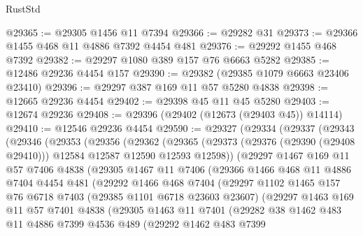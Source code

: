 \begin{lexlean}{RustStd}
\begin{coremodule}
{\begin{coremodule}
{{{{{{{{{{{{{{{{{{{{{{{{{{{{{{{{{{{{{{{{{{{{{{{{{{{{{{{{{{{{{{{{{{{{{{{{{{{{{{{{@29365 := @29305 @1456 @11 @7394
@29366 := @29282 @31
@29373 := @29366 @1455 @468 @11 @4886 @7392 @4454 @481
@29376 := @29292 @1455 @468 @7392
@29382 := @29297 @1080 @389 @157 @76 @6663 @5282
@29385 := @12486 @29236 @4454 @157
@29390 := @29382 (@29385 @1079 @6663 @23406 @23410)
@29396 := @29297 @387 @169 @11 @57 @5280 @4838
@29398 := @12665 @29236 @4454
@29402 := @29398 @45 @11 @45 @5280
@29403 := @12674 @29236
@29408 := @29396 (@29402 (@12673 (@29403 @45)) @14114)
@29410 := @12546 @29236 @4454
@29590 := @29327
    (@29334
      (@29337
        (@29343
          (@29346
            (@29353
              (@29356
                (@29362
                  (@29365
                    (@29373 (@29376 (@29390 (@29408 @29410))) @12584 @12587 @12590 @12593 @12598))
                  (@29297
                    @1467
                    @169
                    @11
                    @57
                    @7406
                    @4838
                    (@29305
                      @1467
                      @11
                      @7406
                      (@29366
                        @1466
                        @468
                        @11
                        @4886
                        @7404
                        @4454
                        @481
                        (@29292
                          @1466
                          @468
                          @7404
                          (@29297
                            @1102
                            @1465
                            @157
                            @76
                            @6718
                            @7403
                            (@29385 @1101 @6718 @23603 @23607)
                            (@29297
                              @1463
                              @169
                              @11
                              @57
                              @7401
                              @4838
                              (@29305
                                @1463
                                @11
                                @7401
                                (@29282
                                  @38
                                  @1462
                                  @483
                                  @11
                                  @4886
                                  @7399
                                  @4536
                                  @489
                                  (@29292
                                    @1462
                                    @483
                                    @7399
}}}}}}}}}}}}}}}}}}}}}}}}}}}}}}}}}}}}}}}}}}}}}}}}}}}}}}}}}}}}}}}}}}}}}}}}}}}}}}}}
\end{coremodule}}
\end{coremodule}
\end{lexlean}
